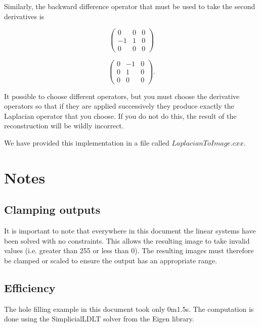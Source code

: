 \documentclass{InsightArticle}
\begin{document}
Similarly, the backward difference operator that must be used to take the second derivatives is

\begin{figure}[H]
  \begin{minipage}[b]{0.5\linewidth}
    \centering

    \begin{equation}
    \begin{pmatrix}
    0 & 0 & 0 \\
    -1 & 1 & 0\\
    0 & 0 & 0
    \end{pmatrix}
    \end{equation}

  \end{minipage}
    \hspace{0.5cm}
  \begin{minipage}[b]{0.5\linewidth}

    \begin{equation}
    \begin{pmatrix}
    0 & -1 & 0 \\
    0 & 1 & 0\\
    0 & 0 & 0
    \end{pmatrix}.
    \end{equation}

  \end{minipage}
\end{figure}

It possible to choose different operators, but you must choose the derivative operators so that if they are applied successively they produce exactly the Laplacian operator that you choose. If you do not do this, the result of the reconstruction will be wildly incorrect.

We have provided this implementation in a file called $LaplacianToImage.cxx$.

\section{Notes}
\subsection{Clamping outputs}
It is important to note that everywhere in this document the linear systems have been solved with no constraints. This allows the resulting image to take invalid values (i.e. greater than 255 or less than 0). The resulting images must therefore be clamped or scaled to ensure the output has an appropriate range.

\subsection{Efficiency}
The hole filling example in this document took only 0m1.5s. The computation is done using the SimplicialLDLT solver from the Eigen library.


\end{document}
